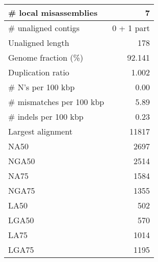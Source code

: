 \documentclass[12pt,a4paper]{article}
\begin{document}
\begin{table}[ht]
\begin{center}
\begin{tabular}{|l*{1}{|r}|}
\# local misassemblies & 7 \\ \hline
\# unaligned contigs & 0 + 1 part \\ \hline
Unaligned length & 178 \\ \hline
Genome fraction (\%) & 92.141 \\ \hline
Duplication ratio & 1.002 \\ \hline
\# N's per 100 kbp & 0.00 \\ \hline
\# mismatches per 100 kbp & 5.89 \\ \hline
\# indels per 100 kbp & 0.23 \\ \hline
Largest alignment & 11817 \\ \hline
NA50 & 2697 \\ \hline
NGA50 & 2514 \\ \hline
NA75 & 1584 \\ \hline
NGA75 & 1355 \\ \hline
LA50 & 502 \\ \hline
LGA50 & 570 \\ \hline
LA75 & 1014 \\ \hline
LGA75 & 1195 \\ \hline
\end{tabular}
\end{center}
\end{table}
\end{document}
